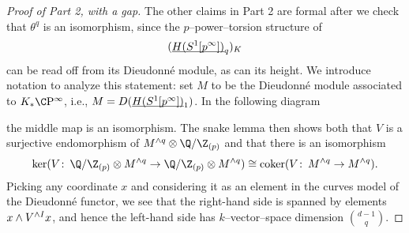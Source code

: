 \begin{proof}[Proof of Part 2, with a gap]\renewcommand{\qedsymbol}{\relax}
The other claims in Part 2 are formal after we check that \(\theta^q\) is an isomorphism, since the \(p\)--power--torsion structure of \[(\OS{H(S^1[p^\infty])}{q})_K\] can be read off from its Dieudonn\'e module, as can its height.  We introduce notation to analyze this statement: set \(M\) to be the Dieudonn\'e module associated to \(K_* \CP^\infty\), i.e., \(M = D(\OS{H(S^1[p^\infty])}{1})\).  In the following diagram
\begin{center}
\end{center}
the middle map is an isomorphism.  The snake lemma then shows both that \(V\) is a surjective endomorphism of \(M^{\wedge q} \otimes \Q/\Z_{(p)}\) and that there is an isomorphism \[\ker(V\co \Q/\Z_{(p)} \otimes M^{\wedge q} \to \Q/\Z_{(p)} \otimes M^{\wedge q}) \cong \operatorname{coker}(V\co M^{\wedge q} \to M^{\wedge q}).\]  Picking any coordinate \(x\) and considering it as an element in the curves model of the Dieudonn\'e functor, we see that the right-hand side is spanned by elements \(x \wedge V^{\wedge I} x\), and hence the left-hand side has \(k\)--vector--space dimension \(\binom{d-1}{q}\).


\end{proof}
